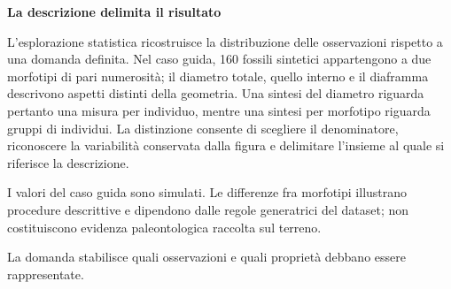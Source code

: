 \documentclass[12pt,aspectratio=1610]{beamer}
\begin{document}
\begin{frame}[plain]
\end{frame}
\begin{lrbox}{\TitleBox}\begin{minipage}[t]{18.2cm}\raggedright\sloppy\color{Ink}\fontsize{20.7}{24}\selectfont \bfseries\color{Navy}La descrizione delimita il risultato\end{minipage}\end{lrbox}
\begin{lrbox}{\BodyBox}\begin{minipage}[t]{10.25cm}\raggedright\sloppy\color{Ink}\fontsize{12.4}{16.4}\selectfont L’esplorazione statistica ricostruisce la distribuzione delle osservazioni rispetto a una domanda definita. Nel caso guida, 160 fossili sintetici appartengono a due morfotipi di pari numerosità; il diametro totale, quello interno e il diaframma descrivono aspetti distinti della geometria. Una sintesi del diametro riguarda pertanto una misura per individuo, mentre una sintesi per morfotipo riguarda gruppi di individui. La distinzione consente di scegliere il denominatore, riconoscere la variabilità conservata dalla figura e delimitare l’insieme al quale si riferisce la descrizione.\end{minipage}\end{lrbox}
\begin{lrbox}{\SideBox}\begin{minipage}[t]{7.45cm}\raggedright\sloppy\color{Ink}\fontsize{12.2}{16.1}\selectfont I valori del caso guida sono simulati. Le differenze fra morfotipi illustrano procedure descrittive e dipendono dalle regole generatrici del dataset; non costituiscono evidenza paleontologica raccolta sul terreno.\end{minipage}\end{lrbox}
\begin{lrbox}{\RecallBox}\begin{minipage}[t]{16.45cm}\raggedright\sloppy\color{Ink}\fontsize{10.1}{13.2}\selectfont La domanda stabilisce quali osservazioni e quali proprietà debbano essere rappresentate.\end{minipage}\end{lrbox}
\end{document}
